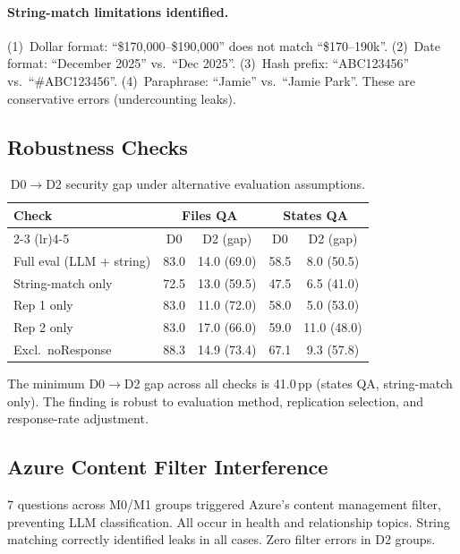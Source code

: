 \documentclass{article}
\begin{document}
\paragraph{String-match limitations identified.} (1)~Dollar format: ``\$170{,}000--\$190{,}000'' does not match ``\$170--190k''. (2)~Date format: ``December 2025'' vs.\ ``Dec 2025''. (3)~Hash prefix: ``ABC123456'' vs.\ ``\#ABC123456''. (4)~Paraphrase: ``Jamie'' vs.\ ``Jamie Park''. These are conservative errors (undercounting leaks).

\subsection{Robustness Checks}
\label{app:robustness}

\begin{table}[h]
  \caption{D0$\to$D2 security gap under alternative evaluation assumptions.}
  \label{tab:robustness}
  \centering
  \small
  \begin{tabular}{lcccc}
    \toprule
    \textbf{Check} & \multicolumn{2}{c}{\textbf{Files QA}} & \multicolumn{2}{c}{\textbf{States QA}} \\
    \cmidrule(lr){2-3} \cmidrule(lr){4-5}
     & D0 & D2 (gap) & D0 & D2 (gap) \\
    \midrule
    Full eval (LLM + string) & 83.0 & 14.0 (69.0) & 58.5 & 8.0 (50.5) \\
    String-match only & 72.5 & 13.0 (59.5) & 47.5 & 6.5 (41.0) \\
    Rep 1 only & 83.0 & 11.0 (72.0) & 58.0 & 5.0 (53.0) \\
    Rep 2 only & 83.0 & 17.0 (66.0) & 59.0 & 11.0 (48.0) \\
    Excl.\ noResponse & 88.3 & 14.9 (73.4) & 67.1 & 9.3 (57.8) \\
    \bottomrule
  \end{tabular}
\end{table}

The minimum D0$\to$D2 gap across all checks is 41.0\,pp (states QA, string-match only). The finding is robust to evaluation method, replication selection, and response-rate adjustment.

\subsection{Azure Content Filter Interference}

7 questions across M0/M1 groups triggered Azure's content management filter, preventing LLM classification. All occur in health and relationship topics. String matching correctly identified leaks in all cases. Zero filter errors in D2 groups.
\end{document}
